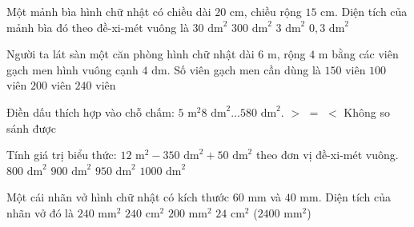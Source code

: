 \begin{ex} %
Một mảnh bìa hình chữ nhật có chiều dài $20\text{ cm}$, chiều rộng $15\text{ cm}$. Diện tích của mảnh bìa đó theo đề-xi-mét vuông là
\choice
{$30\text{ dm}^2$}
{$300\text{ dm}^2$}
{\True $3\text{ dm}^2$}
{$0{,}3\text{ dm}^2$}
\end{ex}

\begin{ex} %
Người ta lát sàn một căn phòng hình chữ nhật dài $6\text{ m}$, rộng $4\text{ m}$ bằng các viên gạch men hình vuông cạnh $4\text{ dm}$. Số viên gạch men cần dùng là
\choice
{\True $150$ viên}
{$100$ viên}
{$200$ viên}
{$240$ viên}
\end{ex}

\begin{ex} %
Điền dấu thích hợp vào chỗ chấm: $5\text{ m}^2 8\text{ dm}^2 \dots 580\text{ dm}^2$.
\choice
{$>$}
{$=$}
{\True $<$}
{Không so sánh được}
\end{ex}

\begin{ex} %
Tính giá trị biểu thức: $12\text{ m}^2 - 350\text{ dm}^2 + 50\text{ dm}^2$ theo đơn vị đề-xi-mét vuông.
\choice
{$800\text{ dm}^2$}
{\True $900\text{ dm}^2$}
{$950\text{ dm}^2$}
{$1000\text{ dm}^2$}
\end{ex}

\begin{ex} %
Một cái nhãn vở hình chữ nhật có kích thước $60\text{ mm}$ và $40\text{ mm}$. Diện tích của nhãn vở đó là
\choice
{$240\text{ mm}^2$}
{$240\text{ cm}^2$}
{$200\text{ mm}^2$}
{\True $24\text{ cm}^2$ ($2400\text{ mm}^2$)}
\end{ex}

